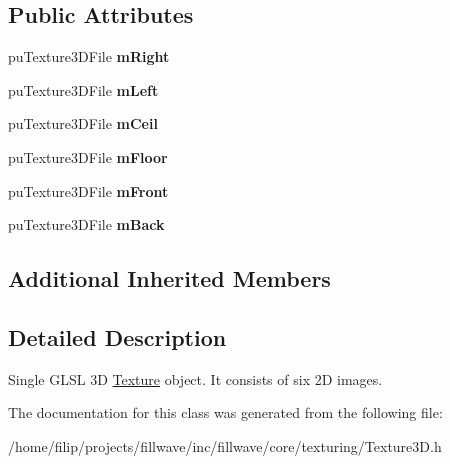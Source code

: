\subsection*{Public Attributes}
\begin{DoxyCompactItemize}
\item 
\mbox{\label{classflw_1_1flc_1_1Texture3D_a84851ce7f149ca0051359f88e808e29a}} 
pu\+Texture3\+D\+File {\bfseries m\+Right}
\item 
\mbox{\label{classflw_1_1flc_1_1Texture3D_a5321ea66b5b8793b8ed6bf1e838660c0}} 
pu\+Texture3\+D\+File {\bfseries m\+Left}
\item 
\mbox{\label{classflw_1_1flc_1_1Texture3D_abfaa2dbfe54e432ac8ba7c1abbdca298}} 
pu\+Texture3\+D\+File {\bfseries m\+Ceil}
\item 
\mbox{\label{classflw_1_1flc_1_1Texture3D_a31f1d430f18ce4048c567b1bf9c3cb73}} 
pu\+Texture3\+D\+File {\bfseries m\+Floor}
\item 
\mbox{\label{classflw_1_1flc_1_1Texture3D_a8c7f5749ce29db32a6d31e53fb8d0ee8}} 
pu\+Texture3\+D\+File {\bfseries m\+Front}
\item 
\mbox{\label{classflw_1_1flc_1_1Texture3D_adc6c2b0bb027a3186cf688b3d4cdb4d0}} 
pu\+Texture3\+D\+File {\bfseries m\+Back}
\end{DoxyCompactItemize}
\subsection*{Additional Inherited Members}


\subsection{Detailed Description}
Single G\+L\+SL 3D \hyperlink{classflw_1_1flc_1_1Texture}{Texture} object. It consists of six 2D images. 

The documentation for this class was generated from the following file\+:\begin{DoxyCompactItemize}
\item 
/home/filip/projects/fillwave/inc/fillwave/core/texturing/Texture3\+D.\+h\end{DoxyCompactItemize}
